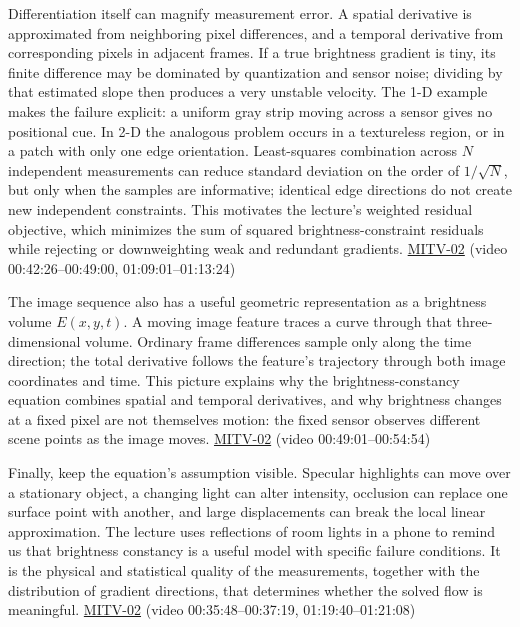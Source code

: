 Differentiation itself can magnify measurement error. A spatial derivative is approximated from neighboring pixel differences, and a temporal derivative from corresponding pixels in adjacent frames. If a true brightness gradient is tiny, its finite difference may be dominated by quantization and sensor noise; dividing by that estimated slope then produces a very unstable velocity. The 1-D example makes the failure explicit: a uniform gray strip moving across a sensor gives no positional cue. In 2-D the analogous problem occurs in a textureless region, or in a patch with only one edge orientation. Least-squares combination across \(N\) independent measurements can reduce standard deviation on the order of \(1/\sqrt{N}\), but only when the samples are informative; identical edge directions do not create new independent constraints. This motivates the lecture's weighted residual objective, which minimizes the sum of squared brightness-constraint residuals while rejecting or downweighting weak and redundant gradients. \hyperref[04-visual-computing-ii-ch036-mitv-02---image-formation-perspective-projection-time-derivative-motion-field]{MITV-02} (video 00:42:26--00:49:00, 01:09:01--01:13:24)

The image sequence also has a useful geometric representation as a brightness volume \(E(x,y,t)\). A moving image feature traces a curve through that three-dimensional volume. Ordinary frame differences sample only along the time direction; the total derivative follows the feature's trajectory through both image coordinates and time. This picture explains why the brightness-constancy equation combines spatial and temporal derivatives, and why brightness changes at a fixed pixel are not themselves motion: the fixed sensor observes different scene points as the image moves. \hyperref[04-visual-computing-ii-ch036-mitv-02---image-formation-perspective-projection-time-derivative-motion-field]{MITV-02} (video 00:49:01--00:54:54)

Finally, keep the equation's assumption visible. Specular highlights can move over a stationary object, a changing light can alter intensity, occlusion can replace one surface point with another, and large displacements can break the local linear approximation. The lecture uses reflections of room lights in a phone to remind us that brightness constancy is a useful model with specific failure conditions. It is the physical and statistical quality of the measurements, together with the distribution of gradient directions, that determines whether the solved flow is meaningful. \hyperref[04-visual-computing-ii-ch036-mitv-02---image-formation-perspective-projection-time-derivative-motion-field]{MITV-02} (video 00:35:48--00:37:19, 01:19:40--01:21:08)


